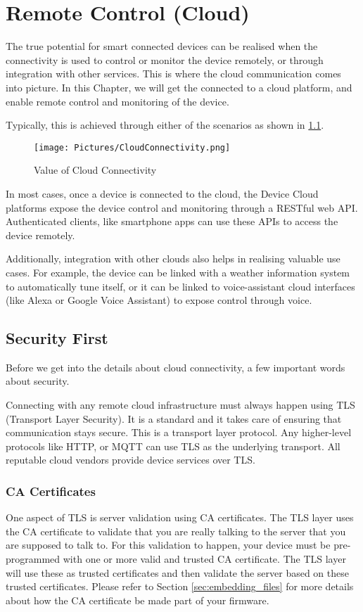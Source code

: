 \documentclass[main.tex]{subfiles}
\begin{document}
\chapter{Remote Control (Cloud)}

The true potential for smart connected devices can be realised when the connectivity is used to control or monitor the device remotely, or through integration with other services. This is where the cloud communication comes into picture. In this Chapter, we will get the connected to a cloud platform, and enable remote control and monitoring of the device.

Typically, this is achieved through either of the scenarios as shown in \ref{fig:cloud_connectivity}.

\begin{figure}
    \centering
    \texttt{[image: Pictures/CloudConnectivity.png]}
    \caption{Value of Cloud Connectivity}
    \label{fig:cloud_connectivity}
\end{figure}

In most cases, once a device is connected to the cloud, the Device Cloud platforms expose the device control and monitoring through a RESTful web API. Authenticated clients, like smartphone apps can use these APIs to access the device remotely.

Additionally, integration with other clouds also helps in realising valuable use cases. For example, the device can be linked with a weather information system to automatically tune itself, or it can be linked to voice-assistant cloud interfaces (like Alexa or Google Voice Assistant) to expose control through voice.

\section{Security First}\label{sec:security_first}
Before we get into the details about cloud connectivity, a few important words about security. 

Connecting with any remote cloud infrastructure must always happen using TLS (Transport Layer Security). It is a standard and it takes care of ensuring that communication stays secure. This is a transport layer protocol. Any higher-level protocols like HTTP, or MQTT can use TLS as the underlying transport. All reputable cloud vendors provide device services over TLS.

\subsection{CA Certificates}
One aspect of TLS is server validation using CA certificates. The TLS layer uses the CA certificate to validate that you are really talking to the server that you are supposed to talk to. For this validation to happen, your device must be pre-programmed with one or more valid and trusted CA certificate. The TLS layer will use these as trusted certificates and then validate the server based on these trusted certificates. Please refer to Section \ref{sec:embedding_files} for more details about how the CA certificate be made part of your firmware.
\end{document}
